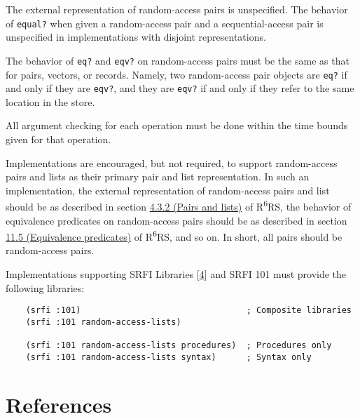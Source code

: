 The external representation of random-access pairs is unspecified. The
behavior of \texttt{equal?} when given a random-access pair and a
sequential-access pair is unspecified in implementations with disjoint
representations.

The behavior of \texttt{eq?} and \texttt{eqv?} on random-access pairs
must be the same as that for pairs, vectors, or records. Namely, two
random-access pair objects are \texttt{eq?} if and only if they are
\texttt{eqv?}, and they are \texttt{eqv?} if and only if they refer to
the same location in the store.

All argument checking for each operation must be done within the time
bounds given for that operation.

Implementations are encouraged, but not required, to support
random-access pairs and lists as their primary pair and list
representation. In such an implementation, the external representation
of random-access pairs and list should be as described in section
\href{http://www.r6rs.org/final/html/r6rs/r6rs-Z-H-7.html\#node_sec_4.3.2}{4.3.2
(Pairs and lists)} of R\textsuperscript{6}RS, the behavior of
equivalence predicates on random-access pairs should be as described in
section
\href{http://www.r6rs.org/final/html/r6rs/r6rs-Z-H-14.html\#node_idx_436}{11.5
(Equivalence predicates)} of R\textsuperscript{6}RS, and so on. In
short, all pairs should be random-access pairs.

Implementations supporting SRFI Libraries
{[}\protect\hyperlink{note-4}{4}{]} and SRFI 101 must provide the
following libraries:

\begin{verbatim}
    (srfi :101)                                 ; Composite libraries
    (srfi :101 random-access-lists)

    (srfi :101 random-access-lists procedures)  ; Procedures only
    (srfi :101 random-access-lists syntax)      ; Syntax only
\end{verbatim}

\section{{References}}\label{references}

